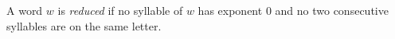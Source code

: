 A word $w$ is \textit{reduced} if no syllable of $w$ has exponent $0$ and no two consecutive syllables are on the same letter.
